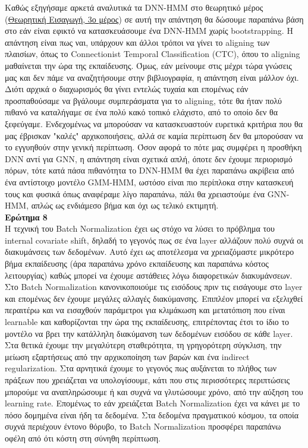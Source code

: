 \documentclass{article}
\begin{document}
Καθώς εξηγήσαμε αρκετά αναλυτικά τα DNN-HMM στο θεωρητικό μέρος (\hyperref[dnn-hmm]{Θεωρητική Εισαγωγή, 3ο μέρος}) σε αυτή την απάντηση θα δώσουμε παραπάνω βάση στο εάν είναι εφικτό να κατασκευάσουμε ένα DNN-HMM χωρίς bootstrapping. Η απάντηση είναι πως ναι, υπάρχουν και άλλοι τρόποι να γίνει το aligning των πλαισίων, όπως το Connectionist Temporal Classification (CTC), όπου το aligning μαθαίνεται την ώρα της εκπαίδευσης. Όμως, εάν μείνουμε στις μέχρι τώρα γνώσεις μας και δεν πάμε να αναζητήσουμε στην βιβλιογραφία, η απάντηση είναι μάλλον όχι. Διότι αρχικά ο διαχωρισμός θα γίνει εντελώς τυχαία και επομένως εάν προσπαθούσαμε να βγάλουμε συμπεράσματα για το aligning, τότε θα ήταν πολύ πιθανό να καταλήγαμε σε ένα πολύ κακό τοπικό ελάχιστο, από το οποίο δεν θα ξεφεύγαμε. Ενδεχομένως να μπορούσαν να κατασκευαστούν ευρετικά κριτήρια που θα μας έβρισκαν "καλές" αρχικοποιήσεις, αλλά σε καμία περίπτωση δεν θα μπορούσαν να το εγγυηθούν στην γενική περίπτωση. Όσον αφορά το πότε μας συμφέρει η προσθήκη DNN αντί για GNN, η απάντηση είναι σχετικά απλή, όποτε δεν έχουμε περιορισμό πόρων, τότε κατά πάσα πιθανότητα το DNN-HMM θα έχει παραπάνω ακρίβεια από ένα αντίστοιχο μοντέλο GMM-HMM, ωστόσο είναι πιο περίπλοκα στην κατασκευή τους και φυσικά όπως αναφέραμε λίγο παραπάνω, πάλι θα χρειαστούμε ένα GNN-HMM, απλώς ως ενδιάμεσο βήμα και όχι ως τελικό εκτιμητή. 
\\[5mm]
\textbf{Ερώτημα 8}
\\
Η τεχνική του Batch Normalization έχει ως στόχο να λύσει το πρόβλημα του internal covariate shift, δηλαδή το γεγονός πως σε ένα layer αλλάζουν πολύ συχνά οι διακυμάνσεις των δεδομένων. Αυτό έχει ως αποτέλεσμα να χρειαζόμαστε μικρότερο βήμα εκπαίδευσης (άρα παραπάνω χρόνο εκπαίδευσης και παραπάνω κόστος λειτουργίας) καθώς μπορεί να έχουμε αστάθειες λόγω διαφορετικών διακυμάνσεων. Στο Batch Normalization κανονικοποιούμε τις εισόδους πριν τις εισάγουμε στο layer και επομένως δεν έχουμε μεγάλες αλλαγές διακύμανσης. Επιπλέον μπορεί να εξελιχθεί περαιτέρω και να εισαχθούν παράμετροι για κλιμάκωση και μετατόπιση που είναι learnable και καθορίζονται την ώρα της εκπαίδευσης, επιτρέποντας έτσι το ίδιο το μοντέλο να βρει την κατάλληλη διακύμανση των δεδομένων εισόδου σε κάθε layer. Στα θετικά έχουμε την μεγαλύτερη σταθερότητα, τη γρηγορότερη σύγκλιση, την μείωση εξαρτήσεως από την αρχικοποίηση των βαρών και ένα indirect regularization. Στα αρνητικά έχουμε το γεγονός πως αυξάνεται το πλήθος των πράξεων που χρειάζεται να υπολογίσουμε, κάτι που στις περισσότερες περιπτώσεις μπορούμε να αναπληρώσουμε ή και συχνά να γλυτώσουμε χρόνο, από την αύξηση του learning rate. Επομένως το εάν χρειάζεται Batch Normalization έχει να κάνει με το πόσο δομημένα είναι ήδη τα δεδομένα. Στα δεδομένα πραγματικού κόσμου, τα οποία συχνά περιέχουν έντονο θόρυβο, το Batch Normalization προσφέρει παραπάνω οφέλη από ότι κόστη στη σύνηθη περίπτωση.
\end{document}
